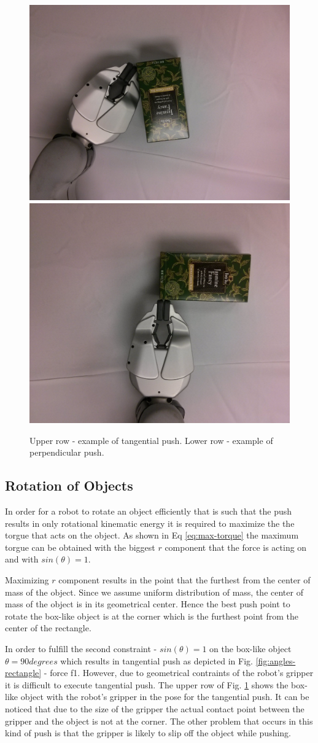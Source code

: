 \begin{figure}

\includegraphics[width=0.4\columnwidth]{figures/peets-tangential.jpg}\\
\includegraphics[width=0.4\columnwidth]{figures/peets-perpendicular.jpg}\\


\caption{Upper row - example of tangential push. Lower row - example of perpendicular push.}
\label{fig:tangential-example}
\end{figure}


\subsection{Rotation of Objects}
In order for a robot to rotate an object efficiently that is such that the push results in only rotational kinematic energy it is required to maximize the the torgue that acts on the object. As shown in Eq \ref{eq:max-torque} the maximum torgue can be obtained with the biggest $r$ component that the force is acting on and with $sin(\theta) = 1$.

Maximizing $r$ component results in the point that the furthest from the center of mass of the object. Since we assume uniform distribution of mass, the center of mass of the object is in its geometrical center. Hence the best push point to rotate the box-like object is at the corner which is the furthest point from the center of the rectangle.

In order to fulfill the second constraint - $sin(\theta) = 1$ on the box-like object $\theta = 90 degrees$ which results in tangential push as depicted in Fig. \ref{fig:angles-rectangle} - force f1. However, due to geometrical contraints of the robot's gripper it is difficult to execute tangential push. The upper row of Fig. \ref{fig:tangential-example} shows the box-like object with the robot's gripper in the pose for the tangential push. It can be noticed that due to the size of the gripper the actual contact point between the gripper and the object is not at the corner. The other problem that occurs in this kind of push is that the gripper is likely to slip off the object while pushing.

